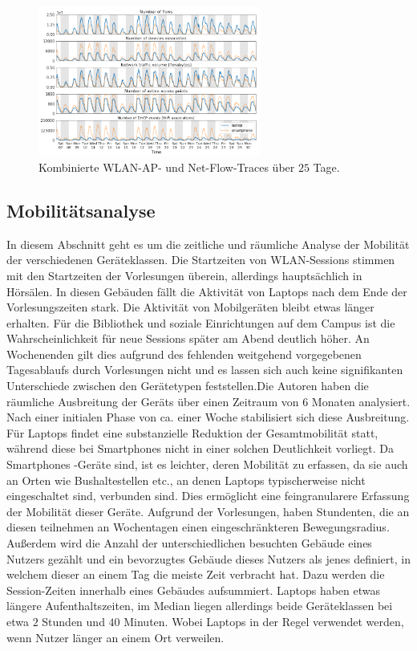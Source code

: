 \documentclass[12pt, a4paper]{article}
\begin{document}
\begin{figure}[H]
    \centering
    \includegraphics[width=0.65\textwidth]{img/traces.png}
    \caption{Kombinierte WLAN-AP- und Net-Flow-Traces über $25$ Tage. \cite{Alipour2018}}
    \label{fig:traces}
\end{figure}

\vfill
\pagebreak

\subsection{Mobilitätsanalyse}

In diesem Abschnitt geht es um die zeitliche und räumliche Analyse der Mobilität der verschiedenen Geräteklassen.
Die Startzeiten von WLAN-Sessions stimmen mit den Startzeiten der Vorlesungen überein, allerdings hauptsächlich in Hörsälen.
In diesen Gebäuden fällt die Aktivität von Laptops nach dem Ende der Vorlesungszeiten stark. Die Aktivität von Mobilgeräten
bleibt etwas länger erhalten. Für die Bibliothek und soziale Einrichtungen auf dem Campus ist die Wahrscheinlichkeit
für neue Sessions später am Abend deutlich höher. An Wochenenden gilt dies aufgrund des fehlenden weitgehend vorgegebenen
Tagesablaufs durch Vorlesungen nicht und es lassen sich auch keine signifikanten Unterschiede zwischen den Gerätetypen 
feststellen.\newline Die Autoren haben die räumliche Ausbreitung der Geräts über einen Zeitraum von 6 Monaten analysiert.
Nach einer initialen Phase von ca. einer Woche stabilisiert sich diese Ausbreitung. Für Laptops findet eine 
substanzielle Reduktion der Gesamtmobilität statt, während diese bei Smartphones nicht in einer solchen Deutlichkeit vorliegt.
Da Smartphones -Geräte sind, ist es leichter, deren Mobilität zu erfassen, da sie auch an Orten
wie Bushaltestellen etc., an denen Laptops typischerweise nicht eingeschaltet sind, verbunden sind.
Dies ermöglicht eine feingranularere Erfassung der Mobilität dieser Geräte. Aufgrund der Vorlesungen, 
haben Stundenten, die an diesen teilnehmen an Wochentagen einen eingeschränkteren Bewegungsradius.\newline
Außerdem wird die Anzahl der unterschiedlichen besuchten Gebäude eines Nutzers gezählt und ein bevorzugtes
Gebäude dieses Nutzers als jenes definiert, in welchem dieser an einem Tag die meiste Zeit verbracht hat.
Dazu werden die Session-Zeiten innerhalb eines Gebäudes aufsummiert.
Laptops haben etwas längere Aufenthaltszeiten, im Median liegen allerdings beide Geräteklassen bei etwa $2$ Stunden
und $40$ Minuten. Wobei Laptops in der Regel verwendet werden, wenn Nutzer länger an einem Ort verweilen.
\end{document}
